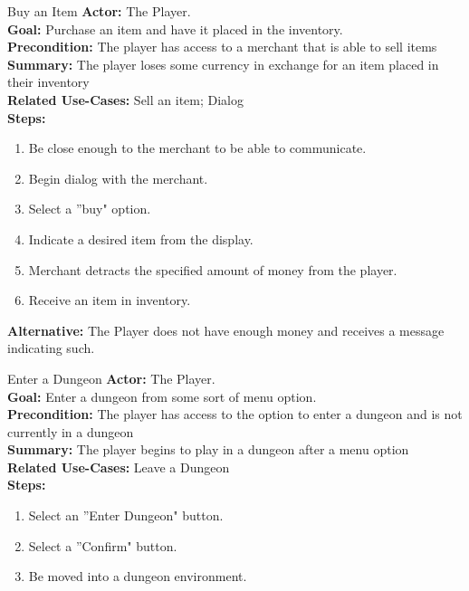 \documentclass[12pt]{report}
\begin{document}
\begin{subsection}{Buy an Item}
\textbf{Actor:} The Player. \\
\textbf{Goal:} Purchase an item and have it placed in the inventory. \\
\textbf{Precondition:} The player has access to a merchant that is able to sell items \\
\textbf{Summary:} The player loses some currency in exchange for an item placed in their inventory \\
\textbf{Related Use-Cases:} Sell an item; Dialog \\
\textbf{Steps:}
\begin{enumerate}
	\item Be close enough to the merchant to be able to communicate.
	\item Begin dialog with the merchant.
	\item Select a ''buy" option.
	\item Indicate a desired item from the display.
	\item Merchant detracts the specified amount of money from the player.
	\item Receive an item in inventory.
\end{enumerate}
\textbf{Alternative:} The Player does not have enough money and receives a message indicating such.
\end{subsection}

\begin{subsection}{Enter a Dungeon}
\textbf{Actor:} The Player. \\
\textbf{Goal:} Enter a dungeon from some sort of menu option. \\
\textbf{Precondition:} The player has access to the option to enter a dungeon and is not currently in a dungeon \\
\textbf{Summary:} The player begins to play in a dungeon after a menu option \\
\textbf{Related Use-Cases:} Leave a Dungeon \\
\textbf{Steps:}
\begin{enumerate}
	\item Select an ''Enter Dungeon" button.
	\item Select a ''Confirm" button.
	\item Be moved into a dungeon environment.
\end{enumerate}
\end{subsection}
\end{document}
